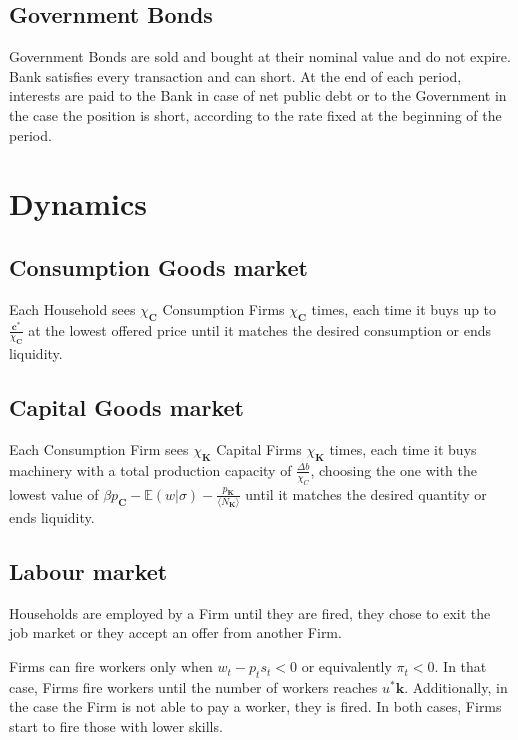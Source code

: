 \documentclass[a4paper, headings=standardclasses]{scrartcl}
\begin{document}
\subsection{Government Bonds}
Government Bonds are sold and bought at their nominal value and do not expire. Bank satisfies every transaction and can short. At the end of each period, interests are paid to the Bank in case of net public debt or to the Government in the case the position is short, according to the rate fixed at the beginning of the period.

\section{Dynamics}
\subsection{Consumption Goods market}
Each Household sees $\chi_\mathbf{C}$ Consumption Firms $\chi_\mathbf{C}$ times, each time it buys up to $\frac{\mathbf{c}^*}{\chi_\mathbf{C}}$ at the lowest offered price until it matches the desired consumption or ends liquidity.

\subsection{Capital Goods market}
Each Consumption Firm sees $\chi_\mathbf{K}$ Capital Firms $\chi_\mathbf{K}$ times, each time it buys machinery with a total production capacity of $\frac{\Delta b}{\chi_C}$, choosing the one with the lowest value of $\beta p_\mathbf{C} - \mathbb{E}(w|\sigma) - \frac{p_\mathbf{K}}{\langle N_\mathbf{K} \rangle}$ until it matches the desired quantity or ends liquidity. %

\subsection{Labour market}
Households are employed by a Firm until they are fired, they chose to exit the job market or they accept an offer from another Firm.

Firms can fire workers only when $w_t - p_t s_t < 0$ or equivalently $\pi_t < 0$. In that case, Firms fire workers until the number of workers reaches $u^* \mathbf{k}$. Additionally, in the case the Firm is not able to pay a worker, they is fired. In both cases, Firms start to fire those with lower skills.
\end{document}
